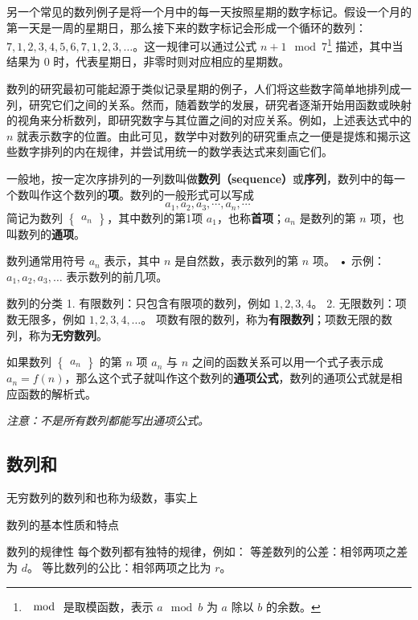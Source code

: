 另一个常见的数列例子是将一个月中的每一天按照星期的数字标记。假设一个月的第一天是一周的星期日，那么接下来的数字标记会形成一个循环的数列：$7, 1, 2, 3, 4, 5, 6, 7, 1, 2, 3, \dots$。这一规律可以通过公式 $n+1 \mod 7$\footnote{$\mod$ 是取模函数，表示 $a \mod b$ 为 $a$ 除以 $b$ 的余数。} 描述，其中当结果为 $0$ 时，代表星期日，非零时则对应相应的星期数。

数列的研究最初可能起源于类似记录星期的例子，人们将这些数字简单地排列成一列，研究它们之间的关系。然而，随着数学的发展，研究者逐渐开始用函数或映射的视角来分析数列，即研究数字与其位置之间的对应关系。例如，上述表达式中的 $n$ 就表示数字的位置。由此可见，数学中对数列的研究重点之一便是提炼和揭示这些数字排列的内在规律，并尝试用统一的数学表达式来刻画它们。


一般地，按一定次序排列的一列数叫做\textbf{数列（sequence）}或\textbf{序列}，数列中的每一个数叫作这个数列的\textbf{项}。数列的一般形式可以写成
\begin{equation}
a_1,a_2,a_3,\cdots,a_n,\cdots~
\end{equation}
简记为数列 $\begin{Bmatrix} a_n \end{Bmatrix}$，其中数列的第1项 $a_1$，也称\textbf{首项}；$a_n$ 是数列的第 $n$ 项，也叫数列的\textbf{通项}。

数列通常用符号 $a_n$ 表示，其中 $n$ 是自然数，表示数列的第 $n$ 项。
	•	示例：$a_1, a_2, a_3, \dots$ 表示数列的前几项。

数列的分类
	1.	有限数列：只包含有限项的数列，例如 $1, 2, 3, 4$。
	2.	无限数列：项数无限多，例如 $1, 2, 3, 4, \dots$。
项数有限的数列，称为\textbf{有限数列}；项数无限的数列，称为\textbf{无穷数列}。

如果数列 $\begin{Bmatrix} a_n \end{Bmatrix}$ 的第 $n$ 项 $a_n$ 与 $n$ 之间的函数关系可以用一个式子表示成 $a_n = f(n)$，那么这个式子就叫作这个数列的\textbf{通项公式}，数列的通项公式就是相应函数的解析式。

\textsl{注意：不是所有数列都能写出通项公式。}

\subsection{数列和}

无穷数列的数列和也称为级数，事实上


数列的基本性质和特点

数列的规律性
每个数列都有独特的规律，例如：
等差数列的公差：相邻两项之差为 $d$。
等比数列的公比：相邻两项之比为 $r$。

